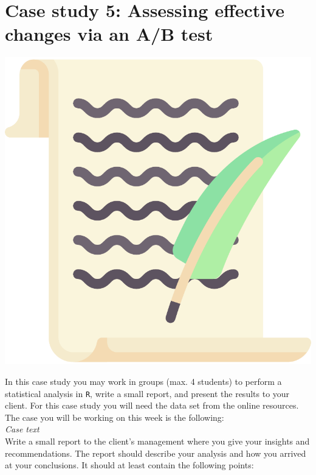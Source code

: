 
\begin{minipage}{0.8\textwidth}
\section{Case study 5: Assessing effective changes via an A/B test}
\end{minipage}%
\hfill%
\begin{minipage}{0.1\textwidth}
\includegraphics[width=\linewidth]{Files/Images/lettericon.pdf}
\end{minipage}
\vspace*{.1cm}

In this case study you may work in groups (max. 4 students) to perform a statistical analysis in \texttt{R}, write a small report, and present the results to your client. For this case study you will need the data set  from the online resources. The case you will be working on this week is the following: \\

\textit{Case text} \\

Write a small report to the client's management where you give your insights and recommendations. The report should describe your analysis and how you arrived at your conclusions. It should at least contain the following points: \\

